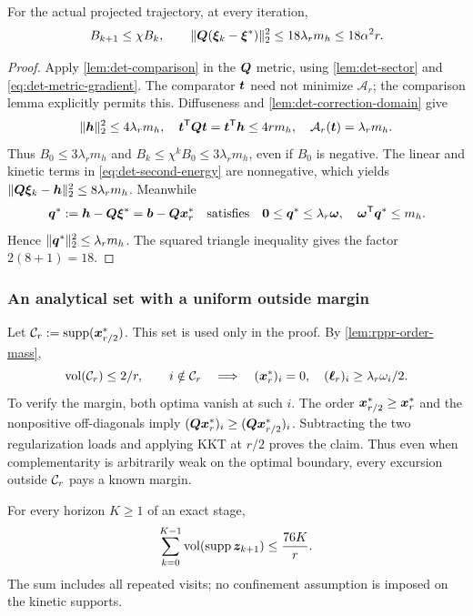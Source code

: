 \begin{lemma}
\label{lem:det-response}
For the actual projected trajectory, at every iteration,
\begin{equation*}
 B_{k+1}\leq\chi B_k,\qquad
 \lVert\bm{Q}(\bm{\xi}_k-\bm{\xi}^*)\rVert_2^2
       \leq18\lambda_r m_h\leq18\alpha^2r.
\end{equation*}
\end{lemma}
\begin{proof}
Apply \cref{lem:det-comparison} in the $\bm{Q}$ metric, using
\cref{lem:det-sector} and \cref{eq:det-metric-gradient}.
The comparator $\bm{t}$ need not minimize $\mathcal A_r$; the comparison
lemma explicitly permits this.
Diffuseness and \cref{lem:det-correction-domain} give
\[
 \lVert\bm{h}\rVert_2^2\leq4\lambda_r m_h,
 \quad \bm{t}^{\mathsf{T}}\bm{Q}\bm{t}=\bm{t}^{\mathsf{T}}\bm{h}\leq4r m_h,
 \quad \mathcal A_r(\bm{t})=\lambda_r m_h.
\]
Thus $B_0\leq3\lambda_r m_h$ and
$B_k\leq\chi^k B_0\leq3\lambda_r m_h$, even if $B_0$ is negative.
The linear and kinetic terms in \cref{eq:det-second-energy} are nonnegative,
which yields $\lVert\bm{Q}\bm{\xi}_k-\bm{h}\rVert_2^2\leq8\lambda_r m_h$.
Meanwhile
\[
 \bm{q}^*:=\bm{h}-\bm{Q}\bm{\xi}^*=\bm{b}-\bm{Q}\bm{x}_r^*
 \quad\hbox{satisfies}\quad
 \bm{0}\leq\bm{q}^*\leq\lambda_r\bm{\omega},
 \quad \bm{\omega}^{\mathsf{T}}\bm{q}^*\leq m_h.
\]
Hence $\lVert\bm{q}^*\rVert_2^2\leq\lambda_r m_h$.
The squared triangle inequality gives the factor $2(8+1)=18$.
\end{proof}

\subsubsection{An analytical set with a uniform outside margin}

Let $\mathcal{C}_r:=\operatorname{supp}(\bm{x}_{r/2}^*)$. This set is used only in the proof.
By \cref{lem:rppr-order-mass},
\begin{equation}
 \operatorname{vol}(\mathcal{C}_r)\leq2/r,\qquad
 i\notin\mathcal{C}_r\quad\Longrightarrow\quad
 (\bm{x}_r^*)_i=0,\quad (\bm{\ell}_r)_i\geq\lambda_r\omega_i/2.
 \label{eq:det-comparison-margin}
\end{equation}
To verify the margin, both optima vanish at such $i$.
The order $\bm{x}_{r/2}^*\geq\bm{x}_r^*$ and the nonpositive off-diagonals
imply $(\bm{Q}\bm{x}_r^*)_i\geq(\bm{Q}\bm{x}_{r/2}^*)_i$.
Subtracting the two regularization loads and applying KKT at $r/2$
proves the claim. Thus even when complementarity is arbitrarily weak on
the optimal boundary, every excursion outside $\mathcal{C}_r$ pays a known margin.

\begin{theorem}
\label{thm:det-kinetic-work}
For every horizon $K\geq1$ of an exact stage,
\begin{equation}
 \sum_{k=0}^{K-1}\operatorname{vol}(\operatorname{supp}\bm{z}_{k+1})\leq\frac{76K}{r}.
 \label{eq:det-kinetic-work}
\end{equation}
The sum includes all repeated visits; no confinement assumption is imposed
on the kinetic supports.
\end{theorem}

